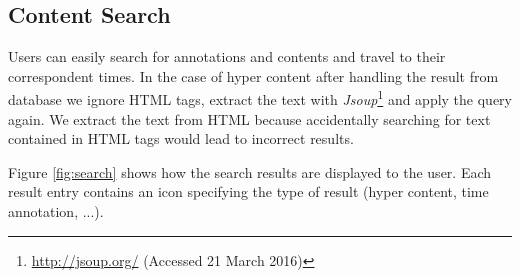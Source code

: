 	\subsection{Content Search}

	Users can easily search for annotations and contents and travel to their correspondent times. In the case of hyper content after handling the result from database we ignore \ac{HTML} tags, extract the text with \emph{Jsoup}\footnote{\url{http://jsoup.org/} (Accessed 21 March 2016)} and apply the query again. We extract the text from \ac{HTML} because accidentally searching for text contained in \ac{HTML} tags would lead to incorrect results.

	Figure \ref{fig:search} shows how the search results are displayed to the user. Each result entry contains an icon specifying the type of result (hyper content, time annotation, ...).




